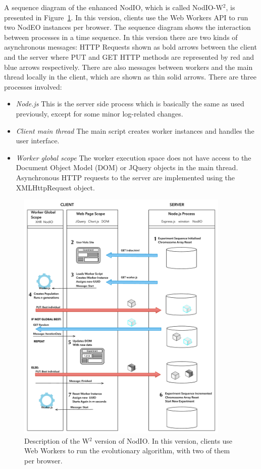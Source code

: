 \documentclass[journal,onecolumn]{IEEEtran}
\begin{document}
A sequence diagram of the enhanced NodIO, which is called NodIO-W$^2$, is presented
in Figure~\ref{fig:system:w2}. In this version, clients use the Web Workers
API to run two {\sf NodEO} instances per browser. The sequence diagram shows the
interaction between processes in a time sequence. In this version there are
two kinds of asynchronous messages: HTTP Requests shown as bold arrows between
the client and the server where PUT and GET HTTP methods are represented by
red and blue arrows respectively. There are also messages between workers and
the main thread locally in the client, which are shown as thin solid arrows.
There are three processes involved:
\begin{itemize}
\item {\em Node.js} This is the server side process which is basically
  the same as used previously, except for some minor log-related
  changes. 
\item {\em Client main thread} The main script creates
worker instances and handles the user interface.
\item {\em Worker global scope} The worker execution space does not have
access to the Document Object Model (DOM) or JQuery objects in the main thread.
Asynchronous HTTP requests to the server are implemented using the
XMLHttpRequest object.  
\end{itemize}
%
\begin{figure}[!htb]
\centering
\includegraphics[width=4in]{Algorithm.pdf}
\caption{Description of the W$^2$ version of {\sf NodIO}. In this
  version, clients use Web Workers to run the evolutionary algorithm,
  with two of them per browser.}
\label{fig:system:w2}
\end{figure}
\end{document}

